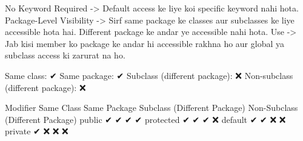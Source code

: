 No Keyword Required -> Default access ke liye koi specific keyword nahi hota.
Package-Level Visibility -> Sirf same package ke classes aur subclasses ke liye accessible hota hai.
Different package ke andar ye accessible nahi hota.
Use -> Jab kisi member ko package ke andar hi accessible rakhna ho aur global ya subclass access ki zarurat na ho.

Same class: ✔
Same package: ✔
Subclass (different package): ❌
Non-subclass (different package): ❌



Modifier	Same Class	Same Package	Subclass (Different Package)	Non-Subclass (Different Package)
public	        ✔	        ✔	                    ✔	                            ✔
protected	    ✔	        ✔	                    ✔	                            ❌
default	        ✔	        ✔	                    ❌	                           ❌
private	        ✔	        ❌	                   ❌	                          ❌